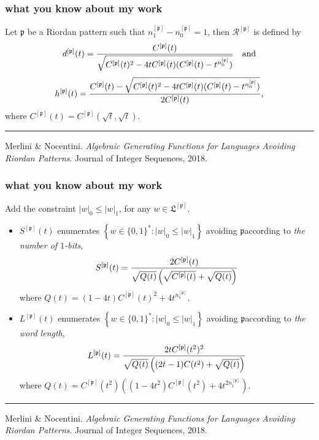 \documentclass[9pt]{beamer}
\begin{document}
\begin{frame}[fragile]
\frametitle{what you know about my work}

Let $\mathfrak{p}$ be a Riordan pattern
such that $n_1^{[\mathfrak{p}]}-n_0^{[\mathfrak{p}]}=1$, then
$\mathcal{R}^{\left[\mathfrak{p}\right]}$ is defined by
$$d^{[\mathfrak{p}]}(t)={C^{[\mathfrak{p}]}(t)
\over \sqrt{C^{[\mathfrak{p}]}(t)^2-4tC^{[\mathfrak{p}]}(t)(C^{[\mathfrak{p}]}(t)-t^{n_0^{[\mathfrak{p}]}})}}\quad\text{and}$$
$$h^{[\mathfrak{p}]}(t)={C^{[\mathfrak{p}]}(t) -\sqrt{C^{[\mathfrak{p}]}(t)^2-4tC^{[\mathfrak{p}]}(t)(C^{[\mathfrak{p}]}(t)-t^{n_0^{[\mathfrak{p}]}})}
\over 2 C^{[\mathfrak{p}]}(t)},$$
where $C^{[\mathfrak{p}]}(t)=C^{[\mathfrak{p}]}(\sqrt{t},\sqrt{t})$.
\vfill
\noindent\rule{\textwidth}{0.1pt}
{\footnotesize
Merlini \& Nocentini. \textit{Algebraic Generating Functions for Languages
Avoiding Riordan Patterns}.  Journal of Integer Sequences, 2018.}
\end{frame}

\begin{frame}[fragile]
\frametitle{what you know about my work}

Add the constraint $|w|_0\leq |w|_1$, for any $w\in \mathfrak{L}^{[\mathfrak{p}]}$.
\begin{itemize}
\item $S^{[\mathfrak{p}]}(t)$ enumerates $\left\lbrace w\in \lbrace 0,1 \rbrace^{*}:
|w|_0\leq |w|_1\right\rbrace$ avoiding $\mathfrak{p}$\newline according to
\textit{the number of $1$-bits},
$$S^{[\mathfrak{p}]}(t)={2C^{[\mathfrak{p}]}(t) \over \sqrt{Q(t)}\left(\sqrt{C^{[\mathfrak{p}]}(t)}+ \sqrt{Q(t)} \right)} $$
    where $Q(t)={(1-4t)C^{[\mathfrak{p}]}(t)^2+4t^{n_1^{[\mathfrak{p}]}}}.$
\item $L^{[\mathfrak{p}]}(t)$ enumerates $\left\lbrace w\in \lbrace 0,1 \rbrace^{*}:
|w|_0\leq |w|_1\right\rbrace$ avoiding $\mathfrak{p}$\newline according to
\textit{the word length},
$$L^{[\mathfrak{p}]}(t)= {2tC^{[\mathfrak{p}]}(t^2)^2 \over \sqrt{Q(t)}\left((2t-1)C(t^2)+ \sqrt{ Q(t) } \right)}$$
where $Q(t)=C^{[\mathfrak{p}]}(t^2)\left( (1-4t^2)C^{[\mathfrak{p}]}(t^2)+4t^{2n_1^{[\mathfrak{p}]}}\right).$
\end{itemize}
\vfill
\noindent\rule{\textwidth}{0.1pt}
{\footnotesize
Merlini \& Nocentini. \textit{Algebraic Generating Functions for Languages
Avoiding Riordan Patterns}.  Journal of Integer Sequences, 2018.}
\end{frame}
\end{document}
